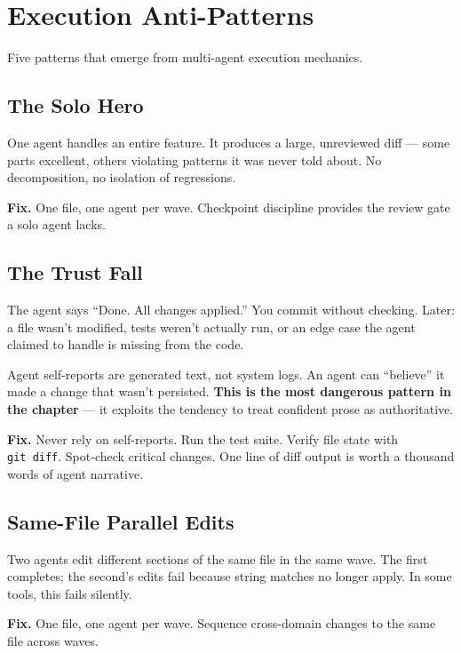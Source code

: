 \documentclass[
  a4paper,
  DIV=11,
  numbers=noendperiod]{scrreprt}
\begin{document}
\section{Execution Anti-Patterns}\label{execution-anti-patterns}

Five patterns that emerge from multi-agent execution mechanics.

\subsection{The Solo Hero}\label{the-solo-hero}

One agent handles an entire feature. It produces a large, unreviewed
diff --- some parts excellent, others violating patterns it was never
told about. No decomposition, no isolation of regressions.

\textbf{Fix.} One file, one agent per wave. Checkpoint discipline
provides the review gate a solo agent lacks.

\subsection{The Trust Fall}\label{the-trust-fall}

The agent says ``Done. All changes applied.'' You commit without
checking. Later: a file wasn't modified, tests weren't actually run, or
an edge case the agent claimed to handle is missing from the code.

Agent self-reports are generated text, not system logs. An agent can
``believe'' it made a change that wasn't persisted. \textbf{This is the
most dangerous pattern in the chapter} --- it exploits the tendency to
treat confident prose as authoritative.

\textbf{Fix.} Never rely on self-reports. Run the test suite. Verify
file state with \texttt{git\ diff}. Spot-check critical changes. One
line of diff output is worth a thousand words of agent narrative.

\subsection{Same-File Parallel Edits}\label{same-file-parallel-edits}

Two agents edit different sections of the same file in the same wave.
The first completes; the second's edits fail because string matches no
longer apply. In some tools, this fails silently.

\textbf{Fix.} One file, one agent per wave. Sequence cross-domain
changes to the same file across waves.
\end{document}
